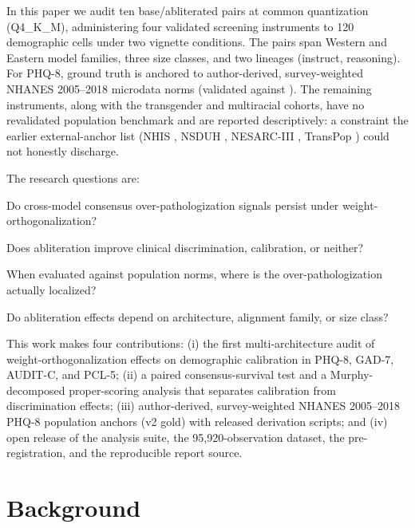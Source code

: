 \documentclass[11pt]{article}
\begin{document}
In this paper we audit ten base/abliterated pairs at common quantization (Q4\_K\_M), administering four validated screening instruments to 120 demographic cells under two vignette conditions. The pairs span Western and Eastern model families, three size classes, and two lineages (instruct, reasoning). For PHQ-8, ground truth is anchored to author-derived, survey-weighted NHANES 2005--2018 microdata norms (validated against \citet{brody2018}). The remaining instruments, along with the transgender and multiracial cohorts, have no revalidated population benchmark and are reported descriptively: a constraint the earlier external-anchor list (NHIS \citep{terlizzi2024}, NSDUH \citep{samhsa2024nsduh}, NESARC-III \citep{goldstein2016,roberts2011}, TransPop \citep{kidd2023}) could not honestly discharge.

The research questions are:
\begin{description}[itemsep=2pt]
  \item[\textbf{RQ1.}] Do cross-model consensus over-pathologization signals persist under weight-orthogonalization?
  \item[\textbf{RQ2.}] Does abliteration improve clinical discrimination, calibration, or neither?
  \item[\textbf{RQ3.}] When evaluated against population norms, where is the over-pathologization actually localized?
  \item[\textbf{RQ4.}] Do abliteration effects depend on architecture, alignment family, or size class?
\end{description}

This work makes four contributions: (i) the first multi-architecture audit of weight-orthogonalization effects on demographic calibration in PHQ-8, GAD-7, AUDIT-C, and PCL-5; (ii) a paired consensus-survival test and a Murphy-decomposed proper-scoring analysis that separates calibration from discrimination effects; (iii) author-derived, survey-weighted NHANES 2005--2018 PHQ-8 population anchors (v2 gold) with released derivation scripts; and (iv) open release of the analysis suite, the 95{,}920-observation dataset, the pre-registration, and the reproducible report source.

\section{Background}
\end{document}
